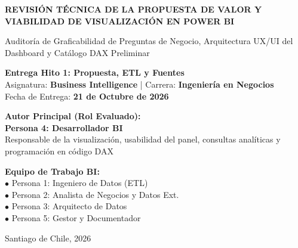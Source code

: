\documentclass[11pt,a4paper]{article}
\begin{document}

\begin{titlepage}
    \centering
    \vspace*{0.8cm}
    {\Huge \bfseries \color{primaryblue} REVISIÓN TÉCNICA DE LA PROPUESTA DE VALOR Y VIABILIDAD DE VISUALIZACIÓN EN POWER BI\par}
    \vspace{0.4cm}
    {\Large \color{secondaryblue} Auditoría de Graficabilidad de Preguntas de Negocio, Arquitectura UX/UI del Dashboard y Catálogo DAX Preliminar\par}
    \vspace{0.8cm}

    \begin{tcolorbox}[colback=lightbg, colframe=primaryblue, width=\textwidth, arc=3mm]
        \centering
        \large \textbf{Entrega Hito 1: Propuesta, ETL y Fuentes}\\[2mm]
        \normalsize Asignatura: \textbf{Business Intelligence} | Carrera: \textbf{Ingeniería en Negocios}\\[1mm]
        Fecha de Entrega: \textbf{21 de Octubre de 2026}
    \end{tcolorbox}

    \vspace{1.5cm}
    \begin{minipage}{0.48\textwidth}
        \textbf{Autor Principal (Rol Evaluado):}\\
        \textbf{\color{primaryblue}Persona 4: Desarrollador BI}\\
        Responsable de la visualización, usabilidad del panel, consultas analíticas y programación en código DAX
    \end{minipage}
    \hfill
    \begin{minipage}{0.46\textwidth}
        \textbf{Equipo de Trabajo BI:}\\
        $\bullet$ Persona 1: Ingeniero de Datos (ETL)\\
        $\bullet$ Persona 2: Analista de Negocios y Datos Ext.\\
        $\bullet$ Persona 3: Arquitecto de Datos\\
        $\bullet$ Persona 5: Gestor y Documentador
    \end{minipage}

    \vfill
    {\small \color{darkgray} Santiago de Chile, 2026}\par
\end{titlepage}
\end{document}
